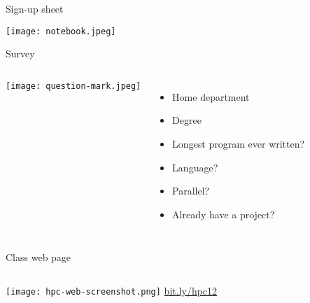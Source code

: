\documentclass[english,compress]{beamer}
\begin{document}
\begin{frame}{Sign-up sheet}
  \begin{center}
    \texttt{[image: notebook.jpeg]}
  \end{center}
\end{frame}
\begin{frame}{Survey}
  \begin{columns}
    \texttt{[image: question-mark.jpeg]}
    \begin{itemize}[<+->]
      \item Home department
      \item Degree
      \item Longest program ever written?
      \item Language?
      \item Parallel?
      \item Already have a project?
    \end{itemize}
  \end{columns}
\end{frame}
\begin{frame}{Class web page}
  \begin{columns}
      \texttt{[image: hpc-web-screenshot.png]}
      \Huge
      \href{http://bit.ly/hpc12}{bit.ly/hpc12}
  \end{columns}
\end{frame}
\end{document}
